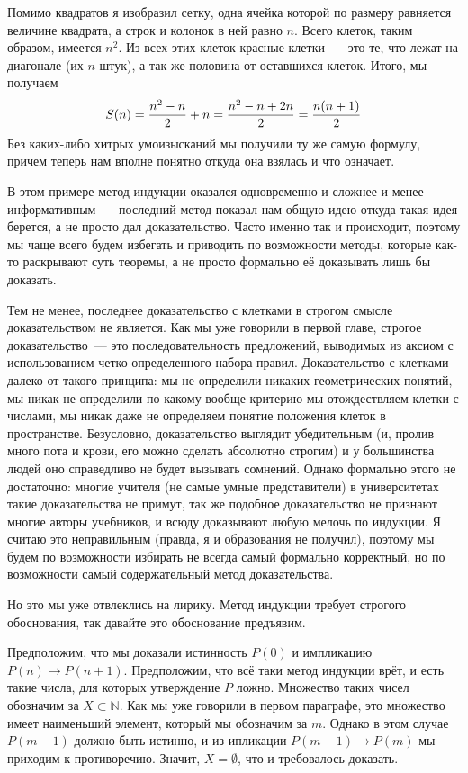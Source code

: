 Помимо квадратов я изобразил сетку, одна ячейка которой по размеру равняется величине квадрата, а строк и колонок в ней равно $n$. Всего клеток, таким образом, имеется $n^2$. Из всех этих клеток красные клетки~--- это те, что лежат на диагонале (их $n$ штук), а так же половина от оставшихся клеток. Итого, мы получаем
$$S(n) = {n^2 - n\over 2} + n = {n^2 - n + 2n \over 2} = {n(n+1)\over 2}$$
Без каких-либо хитрых умоизысканий мы получили ту же самую формулу, причем теперь нам вполне понятно откуда она взялась и что означает.

В этом примере метод индукции оказался одновременно и сложнее и менее информативным~--- последний метод показал нам общую идею откуда такая идея берется, а не просто дал доказательство. Часто именно так и происходит, поэтому мы чаще всего будем избегать и приводить по возможности методы, которые как-то раскрывают суть теоремы, а не просто формально её доказывать лишь бы доказать.

Тем не менее, последнее доказательство с клетками в строгом смысле доказательством не является. Как мы уже говорили в первой главе, строгое доказательство~--- это последовательность предложений, выводимых из аксиом с использованием четко определенного набора правил. Доказательство с клетками далеко от такого принципа: мы не определили никаких геометрических понятий, мы никак не определили по какому вообще критерию мы отождествляем клетки с числами, мы никак даже не определяем понятие положения клеток в пространстве. Безусловно, доказательство выглядит убедительным (и, пролив много пота и крови, его можно сделать абсолютно строгим) и у большинства людей оно справедливо не будет вызывать сомнений. Однако формально этого не достаточно: многие учителя (не самые умные представители) в университетах такие доказательства не примут, так же подобное доказательство не признают многие авторы учебников, и всюду доказывают любую мелочь по индукции. Я считаю это неправильным (правда, я и образования не получил), поэтому мы будем по возможности избирать не всегда самый формально корректный, но по возможности самый содержательный метод доказательства.

Но это мы уже отвлеклись на лирику. Метод индукции требует строгого обоснования, так давайте это обоснование предъявим.

Предположим, что мы доказали истинность $P(0)$ и импликацию $P(n)\to P(n+1)$. Предположим, что всё таки метод индукции врёт, и есть такие числа, для которых утверждение $P$ ложно. Множество таких чисел обозначим за $X\subset \mathbb{N}$. Как мы уже говорили в первом параграфе, это множество имеет наименьший элемент, который мы обозначим за $m$. Однако в этом случае $P(m-1)$ должно быть истинно, и из ипликации $P(m-1)\to P(m)$ мы приходим к противоречию. Значит, $X=\emptyset$, что и требовалось доказать.

